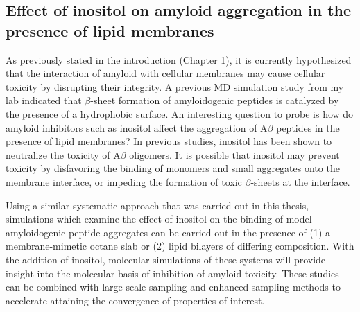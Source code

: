 \subsection{Effect of inositol on amyloid aggregation in the presence of lipid membranes}
As previously stated in the introduction (Chapter 1), it is currently hypothesized that the interaction of amyloid with cellular membranes may cause cellular toxicity by disrupting their integrity.\cite{Pastor:2008p23}  A previous MD simulation study from my lab indicated that $\beta$-sheet formation of amyloidogenic peptides is catalyzed by the presence of a hydrophobic surface.\cite{Nikolic:2010go}  An interesting question to probe is how do amyloid inhibitors such as inositol affect the aggregation of A$\beta$ peptides in the presence of lipid membranes? In previous studies, inositol has been shown to neutralize the toxicity of A$\beta$ oligomers.\cite{McLaurin:2000bq}  It is possible that inositol may prevent toxicity by disfavoring the binding of monomers and small aggregates onto the membrane interface, or impeding the formation of toxic $\beta$-sheets at the interface.

Using a similar systematic approach that was carried out in this thesis, simulations which examine the effect of inositol on the binding of model amyloidogenic peptide aggregates can be carried out in the presence of (1) a membrane-mimetic octane slab\cite{Nikolic:2010go} or (2) lipid bilayers of differing composition. With the addition of inositol, molecular simulations of these systems will provide insight into the  molecular basis of inhibition of amyloid toxicity. These studies can be combined with large-scale sampling and enhanced sampling methods\cite{Rauscher:2009wr} to accelerate attaining the convergence of properties of interest.\cite{Neale:2011cn}

